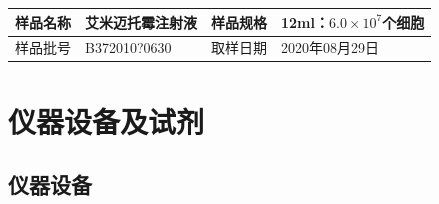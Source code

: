 \documentclass[UTF8,10pt,a4paper,fontset=fandol]{ctexart}
\newcommand{\fieldvalue}[1]{#1}
\newcommand{\handwritten}[1]{#1}
\begin{document}
\begin{tabular}{|p{2.2cm}|p{5.0cm}|p{2.2cm}|p{5.0cm}|}
\hline
样品名称 &
\fieldvalue{艾米迈托霉注射液} &
样品规格 &
\fieldvalue{12ml：$6.0\times10^{7}$个细胞}
\\ \hline
样品批号 &
\fieldvalue{\handwritten{B372010?0630}} &
取样日期 &
\fieldvalue{\handwritten{2020年08月29日}}
\\ \hline
\end{tabular}

\section{仪器设备及试剂}

\subsection{仪器设备}
\end{document}
